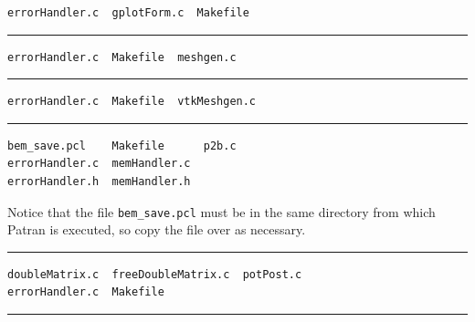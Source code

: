 \documentclass[12pt]{report}
\begin{document}
\begin{verbatim}
errorHandler.c  gplotForm.c  Makefile
\end{verbatim}
\hrule\vspace{1em}


\begin{verbatim}
errorHandler.c	Makefile  meshgen.c
\end{verbatim}
\hrule
\pagebreak


\begin{verbatim}
errorHandler.c  Makefile  vtkMeshgen.c
\end{verbatim}
\hrule\vspace{1em}


\begin{verbatim}
bem_save.pcl    Makefile      p2b.c
errorHandler.c  memHandler.c
errorHandler.h  memHandler.h
\end{verbatim}

Notice that the file \verb+bem_save.pcl+ must be in the same directory from which Patran is executed, so copy the file over as necessary.

\vspace{1em}\hrule\vspace{1em}


\begin{verbatim}
doubleMatrix.c  freeDoubleMatrix.c  potPost.c
errorHandler.c  Makefile
\end{verbatim}
\hrule
\pagebreak
\section*{}
\pagebreak



\end{document}
